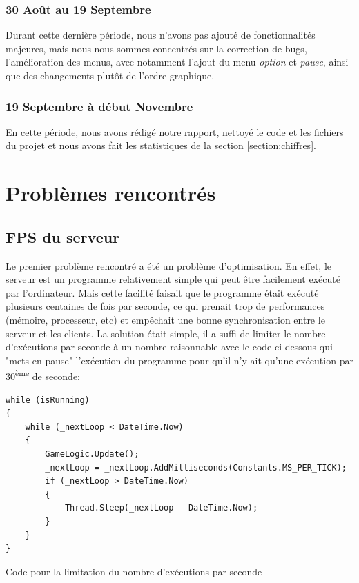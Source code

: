 \documentclass[a4paper]{article}
\begin{document}
\subsubsection{30 Août au 19 Septembre}
Durant cette dernière période, nous n'avons pas ajouté de fonctionnalités majeures, mais nous nous sommes concentrés sur la correction de bugs, l'amélioration des menus, avec notamment l'ajout du menu \textit{option} et \textit{pause}, ainsi que des changements plutôt de l'ordre graphique. 

\subsubsection{19 Septembre à début Novembre}
En cette période, nous avons rédigé notre rapport, nettoyé le code et les fichiers du projet et nous avons fait les statistiques de la section \ref{section:chiffres}.

\newpage
\section{Problèmes rencontrés}
\subsection{FPS du serveur}
Le premier problème rencontré a été un problème d'optimisation. En effet, le serveur est un programme relativement simple qui peut être facilement exécuté par l'ordinateur. Mais cette facilité faisait que le programme était exécuté plusieurs centaines de fois par seconde, ce qui prenait trop de performances (mémoire, processeur, etc) et empêchait une bonne synchronisation entre le serveur et les clients. La solution était simple, il a suffi de limiter le nombre d'exécutions par seconde à un nombre raisonnable avec le code ci-dessous qui "mets en pause" l'exécution du programme pour qu'il n'y ait qu'une exécution par 30\textsuperscript{ème} de seconde:

\begin{listing}[!h]
\begin{verbatim}
while (isRunning)
{
    while (_nextLoop < DateTime.Now)
    {
        GameLogic.Update();
        _nextLoop = _nextLoop.AddMilliseconds(Constants.MS_PER_TICK);
        if (_nextLoop > DateTime.Now)
        {
            Thread.Sleep(_nextLoop - DateTime.Now);
        }
    }
}
\end{verbatim}
\caption{Code pour la limitation du nombre d'exécutions par seconde}
\label{extrait:fps}
\end{listing}
\end{document}
